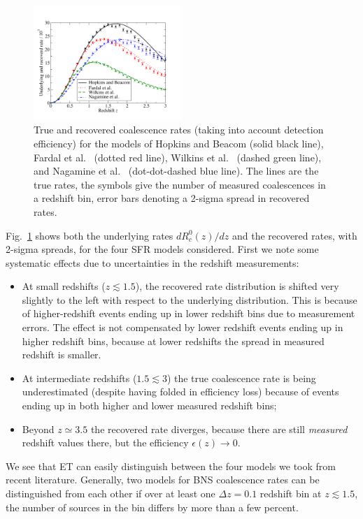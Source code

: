 \begin{figure}
\begin{center}
\includegraphics[width=0.5\textwidth]{./Sec_ET_ScienceCase/rates.pdf}
\caption{True and recovered coalescence rates (taking into account 
detection efficiency) for the models of Hopkins and Beacom 
\cite{sfr-HopkinsBeacom2006} (solid black line), Fardal et al.~\cite{Fardaletal07} 
(dotted red line), Wilkins et al.~\cite{Wilkinsetal08} (dashed green line), and 
Nagamine et al.~\cite{Nagamineetal06} (dot-dot-dashed blue line). The lines 
are the true rates, the symbols give the number of measured 
coalescences in a redshift bin, error bars denoting a 2-sigma 
spread in recovered rates.}
\label{fig:ratesrecovery}
\end{center}
\end{figure}
Fig.~\ref{fig:ratesrecovery} shows both the underlying rates 
$dR^0_c(z)/dz$ and the recovered rates, with 2-sigma spreads, for the four SFR 
models considered. First we note some systematic effects due to uncertainties 
in the redshift measurements:
\begin{itemize}
\item At small redshifts ($z \lesssim 1.5$), the recovered rate distribution is shifted very slightly to the left with respect to the underlying distribution. This is because of higher-redshift events ending up in lower redshift bins due to measurement errors. The effect is not compensated by lower redshift events ending up in higher redshift bins, because at lower redshifts the spread in measured redshift is smaller.
\item At intermediate redshifts ($1.5 \lesssim 3$) the true coalescence rate is being underestimated (despite having folded in efficiency loss) because of events ending up in both higher and lower measured redshift bins;
\item Beyond $z \simeq 3.5$ the recovered rate diverges, because there are still \emph{measured} redshift values there, but the efficiency $\epsilon(z) \rightarrow 0$.
\end{itemize}
We see that ET can easily distinguish between the four models we took from recent literature. Generally, two models for BNS coalescence rates can be distinguished from each other if over at least one $\Delta z = 0.1$ redshift bin at $z \lesssim 1.5$, the number of sources in the bin differs by more than a few percent.


